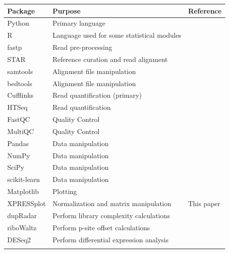 \documentclass[10pt, oneside]{article}
\begin{document}
\begin{table}[!]
    \centering
{}
\begin{tabular}{p{2.4cm}p{7.5cm}p{3cm}}
 \textbf{Package} & \textbf{Purpose} & \textbf{Reference} \\
 \hline
 Python & Primary language & \\
 \hline
 R & Language used for some statistical modules & \\
 \hline
 fastp & Read pre-processing & \cite{fastp} \\
 \hline
 STAR & Reference curation and read alignment & \cite{star} \\
 \hline
 samtools & Alignment file manipulation & \cite{samtools} \\
 \hline
 bedtools & Alignment file manipulation & \cite{bedtools} \\
 \hline
 Cufflinks & Read quantification (primary) & \cite{cufflinks} \\
 \hline
 HTSeq & Read quantification & \cite{htseq} \\
 \hline
 FastQC & Quality Control & \cite{fastqc} \\
 \hline
 MultiQC & Quality Control & \cite{multiqc} \\
 \hline
 Pandas & Data manipulation & \cite{pandas} \\
 \hline
 NumPy & Data manipulation & \cite{numpy1, numpy2} \\
 \hline
 SciPy & Data manipulation & \cite{scipy} \\
 \hline
 scikit-learn & Data manipulation & \cite{sklearn} \\
 \hline
 Matplotlib & Plotting & \cite{matplotlib} \\
 \hline
 XPRESSplot & Normalization and matrix manipulation & This paper \\
 \hline
 dupRadar & Perform library complexity calculations & \cite{dupradar} \\
 \hline
 riboWaltz & Perform p-site offset calculations & \cite{ribowaltz} \\
 \hline
 DESeq2 & Perform differential expression analysis & \cite{deseq2} \\
 \label{Tab:software_pipe}
\end{tabular}
\end{table}
\end{document}
